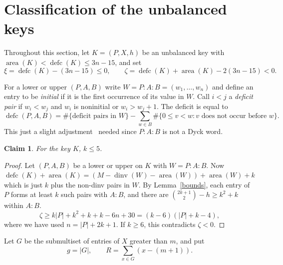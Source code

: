 \documentclass[11pt]{article}
\DeclareMathOperator{\area}{area}\DeclareMathOperator{\dinv}{dinv}
\DeclareMathOperator{\defc}{defc}\DeclareMathOperator{\sym}{sym}
\newtheorem{claim}{Claim}
\begin{document}
\section{Classification of the unbalanced keys}
Throughout this section, let $K=(P,X,h)$ be an unbalanced key with $\area(K)<\defc(K)\le3n-15$, and set
\[
 \xi=\defc(K)-(3n-15)\le0,\qquad
 \zeta=\defc(K)+\area(K)-2(3n-15)<0.
\]

For a lower or upper $(P,A,B)$ write $W=P:A:B=(w_1,\ldots,w_n)$ and define an entry to be \emph{initial} if it is the first occurrence of its value in $W$. Call $i<j$ a \emph{deficit pair} if
 $w_i<w_j$  and $w_i$ is noninitial or $w_i>w_j+1$.
The deficit is equal to
\begin{equation}\label{pair-count}
 \defc(P,A,B)=\#\{\text{deficit pairs in }W\}
 -\sum_{w\in B}\#\{0\le v<w:v\text{ does not occur before }w\}.
\end{equation}
This just a slight adjustment~\cite[Proposition~5.5]{DS} needed since $P:A:B$ is not a Dyck word.

\begin{claim}\label{k-bound}
For the key $K$, $k\le5$.
\end{claim}
\begin{proof}
Let $(P,A,B)$ be a lower or upper on $K$ with $W=P:A:B$. Now $\defc(K)+\area(K) = (M-\dinv(W)-\area(W))+\area(W)+k$ which is just $k$ plus the non-dinv pairs in $W$. By Lemma~\ref{bounds}, each entry of $P$ forms at least $k$ such pairs with $A:B$, and there are
$\binom{2k+1}{2}-h\ge k^2+k$ within $A:B$. 
\[
 \zeta\ge k|P|+k^2+k+k-6n+30
 =(k-6)(|P|+k-4),
\]
where we have used $n=|P|+2k+1$.
If $k\ge6$, this contradicts $\zeta<0$.
\end{proof}

Let $G$ be the submultiset of entries of $X$ greater than $m$, and put
\[
 g=|G|,\qquad R=\sum_{x\in G}(x-(m+1)).
\]
\end{document}
